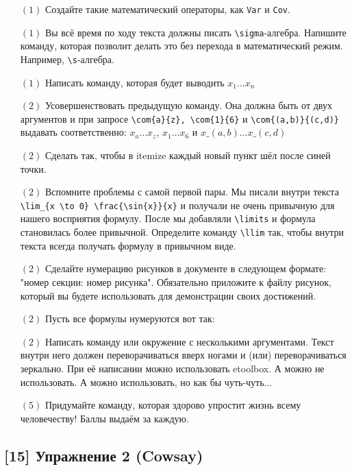 \documentclass[12pt, a4paper, oneside]{article}
\begin{document}
\begin{itemize}
	\item[$(1)$] Создайте такие математический операторы, как \verb|Var| и \verb|Cov|.
	\item[$(1)$] Вы всё время по ходу текста должны писать \verb|\sigma|-алгебра. Напишите команду, которая позволит делать это без перехода в математический режим. Например,  \verb|\s|-алгебра.
	\item[$(1)$] Написать команду, которая будет выводить $x_1 \ldots x_n$
	\item[$(2)$] Усовершенствовать предыдущую команду. Она должна быть от двух аргументов и при запросе \verb|\com{a}{z}, \com{1}{6}| и \verb|\com{(a,b)}{(c,d)}| выдавать соответственно:  $x_a \ldots x_z$, 
	$x_1 \ldots x_6$ и   $x\_{(a,b)} \ldots x\_{(c,d)}$
	\item[$(2)$] Сделать так, чтобы в itemize каждый новый пункт шёл после синей точки.
	
	
	\item[$(2)$] Вспомните проблемы с самой первой пары. Мы писали внутри текста \verb|\lim_{x \to 0} \frac{\sin{x}}{x}| и получали не очень привычную для нашего восприятия формулу. После мы добавляли \verb|\limits| и формула становилась более привычной. Определите команду \verb|\llim| так, чтобы внутри текста всегда получать формулу в привычном виде.
	\item[$(2)$] Сделайте нумерацию рисунков в документе в следующем формате: "номер секции: номер рисунка". Обязательно приложите к файлу рисунок, который вы будете использовать для демонстрации своих достижений.
	\item[$(2)$] Пусть все формулы нумеруются вот так: 
	
	
	\item[$(2)$] Написать команду или окружение с несколькими аргументами. Текст внутри него должен переворачиваться вверх ногами и (или) переворачиваться зеркально. При её написании можно использовать etoolbox. А можно не использовать. А можно использовать, но как бы чуть-чуть...
	\item[$(5)$] Придумайте команду, которая здорово упростит жизнь всему человечеству! Баллы выдаём за каждую. 
\end{itemize}

\subsection*{[15]  Упражнение 2  (Cowsay)}
\end{document}
